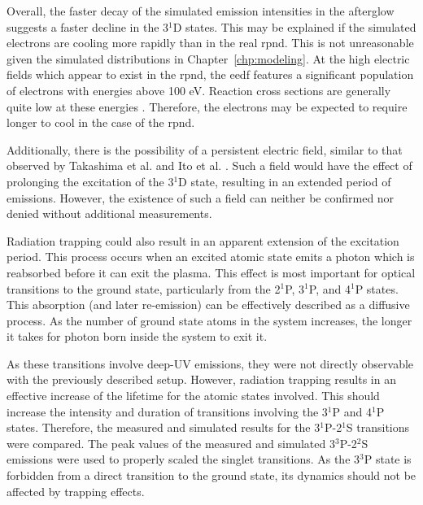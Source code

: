 Overall, the faster decay of the simulated emission intensities in the afterglow
suggests a faster decline in the 3$^1$D states. This may be explained if the
simulated electrons are cooling more rapidly than in the real \acs{rpnd}. This
is not unreasonable given the simulated distributions in
Chapter~\ref{chp:modeling}. At the high electric fields which appear to exist in
the \acs{rpnd}, the \acs{eedf} features a significant population of electrons
with energies above 100 eV. Reaction cross sections are generally quite low at
these energies \cite{Ralchenko2008}. Therefore, the electrons may be expected to
require longer to cool in the case of the \acs{rpnd}.

Additionally, there is the possibility of a persistent electric field, similar
to that observed by Takashima et al. \cite{Takashima2011} and Ito et al.
\cite{Ito2010}. Such a field would have the effect of prolonging the excitation
of the 3$^1$D state, resulting in an extended period of emissions. However, the
existence of such a field can neither be confirmed nor denied without additional
measurements.

Radiation trapping \cite{Kunze2009} could also result in an apparent extension
of the excitation period. This process occurs when an excited atomic state emits
a photon which is reabsorbed before it can exit the plasma. This effect is most
important for optical transitions to the ground state, particularly from the
2$^1$P, 3$^1$P, and 4$^1$P states. This absorption (and later re-emission) can
be effectively described as a diffusive process. As the number of ground state
atoms in the system increases, the longer it takes for photon born inside the
system to exit it.

As these transitions involve deep-UV emissions, they were not directly
observable with the previously described setup. However, radiation trapping
results in an effective increase of the lifetime for the atomic states involved.
This should increase the intensity and duration of transitions involving the
3$^1$P and 4$^1$P states. Therefore, the measured and simulated results for the
3$^1$P-2$^1$S transitions were compared. The peak values of the measured and
simulated 3$^3$P-2$^2$S emissions were used to properly scaled the singlet
transitions. As the 3$^3$P state is forbidden from a direct transition to the
ground state, its dynamics should not be affected by trapping effects.

